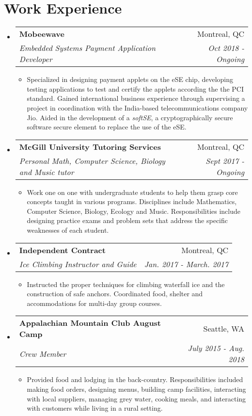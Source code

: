 \documentclass[letterpaper,11pt]{article}
\makeatletter
\newcommand{\resitem}[1]{\item #1 \vspace{-2pt}}
\newcommand{\ressubheading}[4]{
\begin{tabular*}{6.1in}{l@{\extracolsep{\fill}}r}
		\textbf{#1} & #2 \\
		\textit{#3} & \textit{#4} \\
\end{tabular*}\vspace{-1pt}}
\makeatother
\begin{document}
\section*{Work Experience}
\begin{itemize}
\item
	\ressubheading{Mobeewave}{Montreal, QC}{Embedded Systems Payment Application Developer}{Oct 2018 - Ongoing}
	\begin{itemize}
		\resitem{Specialized in designing payment applets on the eSE chip, developing testing applications to test and certify the applets according the the PCI standard. Gained international business experience through supervising a project in coordination with the India-based telecommunications company Jio. Aided in the development of a \textit{softSE}, a cryptographically secure software secure element to replace the use of the eSE.}
	\end{itemize}
	
\item
	\ressubheading{McGill University Tutoring Services}{Montreal, QC}{Personal Math, Computer Science, Biology and Music tutor}{Sept 2017 - Ongoing}
	\begin{itemize}
		\resitem{Work one on one with undergraduate students to help them grasp core concepts taught in various programs. Disciplines include Mathematics, Computer Science, Biology, Ecology and Music. Responsibilities include designing practice exams and problem sets that address the specific weaknesses of each student.}
	\end{itemize}
	
\item
	\ressubheading{Independent Contract}{Montreal, QC}{Ice Climbing Instructor and Guide}{Jan. 2017 - March. 2017}
	\begin{itemize}
		\resitem{Instructed the proper techniques for climbing waterfall ice and the construction of safe anchors. Coordinated food, shelter and accommodations for multi-day group courses.}
	\end{itemize}

\item 
	\ressubheading{Appalachian Mountain Club August Camp}{Seattle, WA}{Crew Member}{July 2015 - Aug. 2018}
	\begin{itemize}
		\resitem{Provided food and lodging in the back-country. Responsibilities included making food orders, designing menus, building camp facilities, interacting with local suppliers, managing grey water, cooking meals, and interacting with customers while living in a rural setting.}
	\end{itemize}


\end{itemize}
\end{document}
